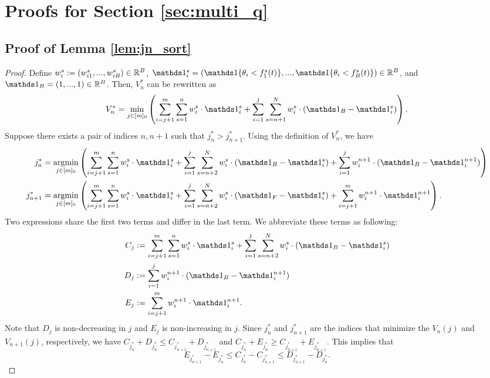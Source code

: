\section{Proofs for Section \ref{sec:multi_q}} 


\subsection{Proof of Lemma \ref{lem:jn_sort}} \label{pf:jn_sort}
\begin{proof}
Define $w_i^s := (w_{i1}^s, ..., w_{iB}^s) \in \mathbb{R}^B$, $\one_i^s = (\indi{\theta_i < f_1^s(t)}, ..., \indi{\theta_i < f_B^s(t)}) \in \R^B$, and $\one_B = (1, ..., 1) \in \R^B$. Then, $V_n^*$ can be rewritten as
\[
V_n^* = \min_{j \in [m]_0} \left( \sum_{i=j+1}^{m} \sum_{s=1}^{n} w_i^s \cdot \one_i^s + \sum_{i=1}^{j} \sum_{s=n+1}^{N}  w_i^s \cdot (\one_B - \one_i^s) \right).
\]
Suppose there exists a pair of indices $n, n+1$ such that $j_n^* > j_{n+1}^*$. Using the definition of $V_n^*$, we have 
\begin{align*}
j_n^* &= \argmin_{j \in [m]_0} \left( \sum_{i=j+1}^{m} \sum_{s=1}^{n} w_i^s \cdot \one_i^s + \sum_{i=1}^{j} \sum_{s=n+2}^{N}  w_i^s \cdot (\one_B - \one_i^s) + \sum_{i=1}^{j} w_i^{n+1} \cdot (\one_B - \one_i^{n+1})\right) \\
j_{n+1}^* &= \argmin_{j \in [m]_0} \left( \sum_{i=j+1}^{m} \sum_{s=1}^{n} w_i^s \cdot \one_i^s + \sum_{i=1}^{j} \sum_{s=n+2}^{N}  w_i^s \cdot (\one_F - \one_i^s) + \sum_{i=j+1}^{m} w_i^{n+1} \cdot \one_i^{n+1}\right).
\end{align*}
Two expressions share the first two terms and differ in the last term. We abbreviate these terms as following:
\begin{align*}
C_j & := \sum_{i=j+1}^{m} \sum_{s=1}^{n} w_i^s \cdot \one_i^s + \sum_{i=1}^{j} \sum_{s=n+2}^{N}  w_i^s \cdot (\one_B - \one_i^s) \\
D_j & := \sum_{i=1}^{j} w_i^{n+1} \cdot (\one_B - \one_i^{n+1}) \\
E_j & := \sum_{i=j+1}^{m} w_i^{n+1} \cdot \one_i^{n+1}.
\end{align*}
Note that $D_j$ is non-decreasing in $j$ and $E_j$ is non-increasing in $j$.
Since $j_n^*$ and $j_{n+1}^*$ are the indices that minimize the $V_n(j)$ and $V_{n+1}(j)$, respectively, we have $C_{j_n^*} + D_{j_n^*} \leq C_{j_{n+1}^*} + D_{j_{n+1}^*}$ and $C_{j_n^*} + E_{j_n^*} \geq C_{j_{n+1}^*} + E_{j_{n+1}^*}$. This implies that 
\[
E_{j_{n+1}^*} - E_{j_n^*} \leq C_{j_n^*} - C_{j_{n+1}^*} \leq D_{j_{n+1}^*} - D_{j_n^*}.
\]

\end{proof}
